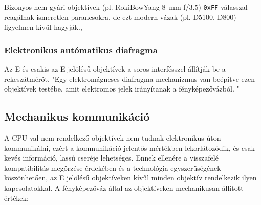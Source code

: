 Bizonyos nem gyári objektívek (pl. RokiBowYang 8~mm f/3.5) \texttt{0xFF} 
válasszal reagálnak ismeretlen parancsokra, de ezt modern vázak (pl. D5100, 
D800) figyelmen kívül hagyják.\cite{nikonhacker_fmount}, \cite{lainy_nikonlens_issue1}


\subsubsection{Elektronikus autómatikus diafragma}
Az E és csakis az E jelölésű objektívek a soros interfésszel állítják be a rekeszátmérőt.
"Egy elektromágneses diafragma mechanizmus van beépítve ezen objektívek testébe, amit elektromos jelek irányítanak a fényképezővázból. "\cite{Lens_naming}

\subsection{Mechanikus kommunikáció}
A CPU-val nem rendelkező objektívek nem tudnak elektronikus úton kommunikálni, ezért a kommunikáció jelentős mértékben lekorlátozódik, és csak kevés információ, lassú cseréje lehetséges.
Ennek ellenére a visszafelé kompatibilitás megőrzése érdekében és a technológia egyszerűségének köszönhetően, az E jelölésű objektíveken kívűl minden objektív rendelkezik ilyen kapcsolatokkal.
A fényképezőváz által az objektíveken mechanikusan állított értékek:
